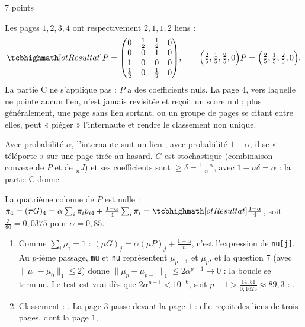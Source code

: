 \begin{corrigeEval}{7 points}{}
\begin{questions}[start=9]
  \item Les pages $1,2,3,4$ ont respectivement $2,1,1,2$ liens :
    \[\res{P=\begin{pmatrix}0&\frac12&\frac12&0\\0&0&1&0\\1&0&0&0\\\frac12&0&\frac12&0\end{pmatrix}},\qquad
      \Bigl(\tfrac25,\tfrac15,\tfrac25,0\Bigr)P=\Bigl(\tfrac25,\tfrac15,\tfrac25,0\Bigr).\]
    La partie C ne s'applique pas : $P$ a des coefficients nuls. La page $4$,
    vers laquelle ne pointe aucun lien, n'est jamais revisitée et reçoit un
    score nul ; plus généralement, une page sans lien sortant, ou un groupe
    de pages se citant entre elles, peut « piéger » l'internaute et rendre
    le classement non unique. 
  \item Avec probabilité $\alpha$, l'internaute suit un lien ; avec
    probabilité $1-\alpha$, il se « téléporte » sur une page tirée au hasard.
    $G$ est stochastique (combinaison convexe de $P$ et de
    $\frac1nJ$) et ses coefficients sont $\geqslant\delta=\frac{1-\alpha}{n}$,
    avec $1-n\delta=\alpha$ : la partie C donne
    .
  \item La quatrième colonne de $P$ est nulle :
    $\pi_4=(\pi G)_4=\alpha\sum_i\pi_ip_{i4}+\frac{1-\alpha}{4}\sum_i\pi_i=\res{\frac{1-\alpha}{4}}$,
    soit $\frac{3}{80}=0{,}0375$ pour $\alpha=0{,}85$. \pts{1 pt}
  \item \begin{enumerate}[label=\alph*)]
      \item Comme $\sum_i\mu_i=1$ : $(\mu G)_j=\alpha(\mu P)_j+\frac{1-\alpha}{n}$,
        c'est l'expression de \texttt{nu[j]}. Au $p$-ième passage,
        \texttt{mu} et \texttt{nu} représentent $\mu_{p-1}$ et $\mu_p$, et la
        question 7 (avec $\lVert\mu_1-\mu_0\rVert_1\leqslant2$) donne
        $\lVert\mu_p-\mu_{p-1}\rVert_1\leqslant2\alpha^{p-1}\to0$ : la boucle
        se termine. Le test est vrai dès que $2\alpha^{p-1}<10^{-6}$, soit
        $p-1>\frac{14{,}51}{0{,}1625}\approx89{,}3$ : .
      \item Classement : . La page $3$ passe devant la
        page $1$ : elle reçoit des liens de trois pages, dont la page $1$,

\end{enumerate}
\end{questions}
\end{corrigeEval}
